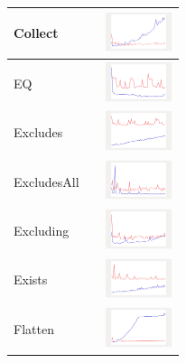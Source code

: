 \begin{longtable}{ m{2.5cm} m{8cm} m{2cm} }
  Collect &

&
\includegraphics[width=2cm]{graphs/bag/small/Collect}
\\\hline

EQ &

&
\includegraphics[width=2cm]{graphs/bag/small/EQ}
\\\hline

Excludes &

&
\includegraphics[width=2cm]{graphs/bag/small/Excludes}
\\\hline

ExcludesAll &

&
\includegraphics[width=2cm]{graphs/bag/small/ExcludesAll}
\\\hline

Excluding &

&
\includegraphics[width=2cm]{graphs/bag/small/Excluding}
\\\hline

Exists &

&
\includegraphics[width=2cm]{graphs/bag/small/Exists}
\\\hline

Flatten &

&
\includegraphics[width=2cm]{graphs/bag/small/Flatten}
\\\hline


\end{longtable}
